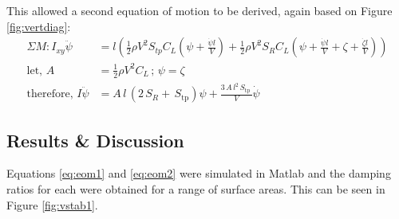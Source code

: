 \documentclass[11pt,a4paper]{article}
\begin{document}
This allowed a second equation of motion to be derived, again based on Figure \ref{fig:vertdiag}:
\begin{align}{}
\Sigma M: I_{xy}\ddot{\psi}&=l(\frac{1}{2}\rho V^2 S_{tp}C_L(\psi+\frac{\dot{\psi}l}{V})+\frac{1}{2}\rho V^2 S_R C_L(\psi+\frac{\dot{\psi}l}{V}+\zeta+\frac{\dot{\zeta}l}{V})) \\
\text{let,}\,\,A&=\frac{1}{2}\rho V^2 C_L\,;\, \psi=\zeta\\
 \text{therefore,}\,\,I\ddot{\psi}&=A\,l\,\left(2\,S_{R}+\,S_{\mathrm{tp}} \right) \psi+\frac{3\,A\,l^2\,S_{\mathrm{tp}}\,}{V} \dot{\psi} \label{eq:eom2}
\end{align}{}

\subsection{Results \& Discussion}
Equations \ref{eq:eom1} and \ref{eq:eom2} were simulated in Matlab and the damping ratios for each were obtained for a range of surface areas. This can be seen in Figure \ref{fig:vstab1}.
\end{document}
